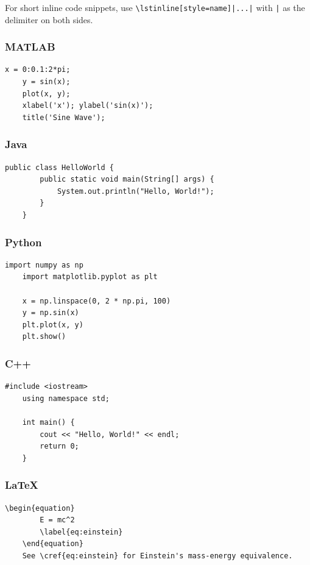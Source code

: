 For short inline code snippets, use \texttt{\textbackslash lstinline[style=name]|...|} with \texttt{|} as the delimiter on both sides.

\subsubsection{MATLAB}
\begin{lstlisting}[style=matlab,
	caption={MATLAB Example.},
	label={lst:MATLAB}]
	x = 0:0.1:2*pi;
	y = sin(x);
	plot(x, y);
	xlabel('x'); ylabel('sin(x)');
	title('Sine Wave');
\end{lstlisting}

\subsubsection{Java}
\begin{lstlisting}[style=java,
	caption={Java Example.}]
	public class HelloWorld {
		public static void main(String[] args) {
			System.out.println("Hello, World!");
		}
	}
\end{lstlisting}

\subsubsection{Python}
\begin{lstlisting}[style=python,
	caption={Python Example.}]
	import numpy as np
	import matplotlib.pyplot as plt
	
	x = np.linspace(0, 2 * np.pi, 100)
	y = np.sin(x)
	plt.plot(x, y)
	plt.show()
\end{lstlisting}

\subsubsection{C++}
\begin{lstlisting}[style=cpp,
	caption={C++ Example.}]
	#include <iostream>
	using namespace std;
	
	int main() {
		cout << "Hello, World!" << endl;
		return 0;
	}
\end{lstlisting}

\subsubsection{LaTeX}
\begin{lstlisting}[style=latex,
	caption={LaTeX Example.}]
	\begin{equation}
		E = mc^2
		\label{eq:einstein}
	\end{equation}
	See \cref{eq:einstein} for Einstein's mass-energy equivalence.
\end{lstlisting}

